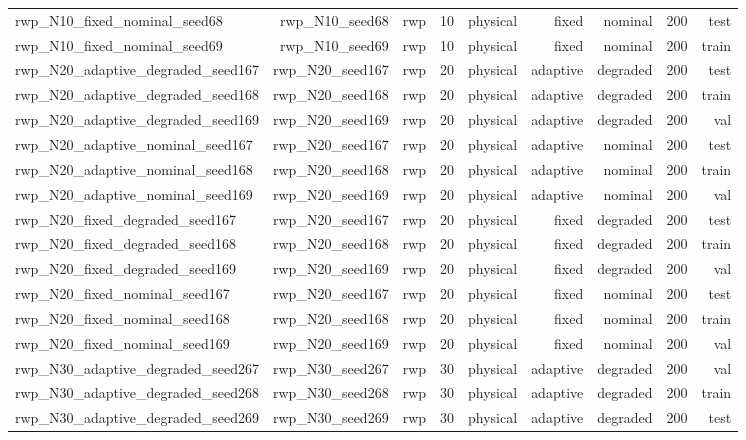 \begin{tabular}{lrrrrrrrr}
rwp\_N10\_fixed\_nominal\_seed68 & rwp\_N10\_seed68 & rwp & 10 & physical & fixed & nominal & 200 & test \\
rwp\_N10\_fixed\_nominal\_seed69 & rwp\_N10\_seed69 & rwp & 10 & physical & fixed & nominal & 200 & train \\
rwp\_N20\_adaptive\_degraded\_seed167 & rwp\_N20\_seed167 & rwp & 20 & physical & adaptive & degraded & 200 & test \\
rwp\_N20\_adaptive\_degraded\_seed168 & rwp\_N20\_seed168 & rwp & 20 & physical & adaptive & degraded & 200 & train \\
rwp\_N20\_adaptive\_degraded\_seed169 & rwp\_N20\_seed169 & rwp & 20 & physical & adaptive & degraded & 200 & val \\
rwp\_N20\_adaptive\_nominal\_seed167 & rwp\_N20\_seed167 & rwp & 20 & physical & adaptive & nominal & 200 & test \\
rwp\_N20\_adaptive\_nominal\_seed168 & rwp\_N20\_seed168 & rwp & 20 & physical & adaptive & nominal & 200 & train \\
rwp\_N20\_adaptive\_nominal\_seed169 & rwp\_N20\_seed169 & rwp & 20 & physical & adaptive & nominal & 200 & val \\
rwp\_N20\_fixed\_degraded\_seed167 & rwp\_N20\_seed167 & rwp & 20 & physical & fixed & degraded & 200 & test \\
rwp\_N20\_fixed\_degraded\_seed168 & rwp\_N20\_seed168 & rwp & 20 & physical & fixed & degraded & 200 & train \\
rwp\_N20\_fixed\_degraded\_seed169 & rwp\_N20\_seed169 & rwp & 20 & physical & fixed & degraded & 200 & val \\
rwp\_N20\_fixed\_nominal\_seed167 & rwp\_N20\_seed167 & rwp & 20 & physical & fixed & nominal & 200 & test \\
rwp\_N20\_fixed\_nominal\_seed168 & rwp\_N20\_seed168 & rwp & 20 & physical & fixed & nominal & 200 & train \\
rwp\_N20\_fixed\_nominal\_seed169 & rwp\_N20\_seed169 & rwp & 20 & physical & fixed & nominal & 200 & val \\
rwp\_N30\_adaptive\_degraded\_seed267 & rwp\_N30\_seed267 & rwp & 30 & physical & adaptive & degraded & 200 & val \\
rwp\_N30\_adaptive\_degraded\_seed268 & rwp\_N30\_seed268 & rwp & 30 & physical & adaptive & degraded & 200 & train \\
rwp\_N30\_adaptive\_degraded\_seed269 & rwp\_N30\_seed269 & rwp & 30 & physical & adaptive & degraded & 200 & test \\

\end{tabular}
